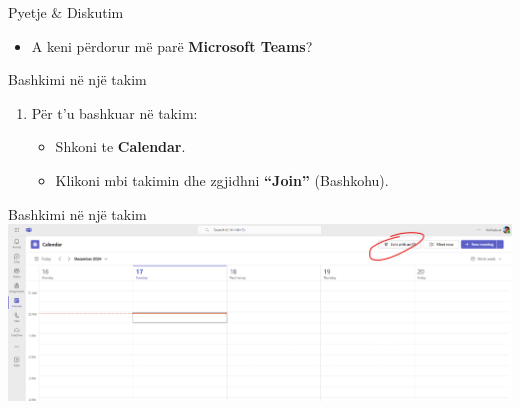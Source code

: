 \documentclass[
  ignorenonframetext,
]{beamer}
\providecommand{\tightlist}{%
  \setlength{\itemsep}{0pt}\setlength{\parskip}{0pt}}
\begin{document}
\begin{frame}{Pyetje \& Diskutim}
\label{pyetje-diskutim-8}
\begin{itemize}
\tightlist
\item
  A keni përdorur më parë \textbf{Microsoft Teams}?
\end{itemize}
\end{frame}

\begin{frame}{Bashkimi në një takim}
\label{bashkimi-nuxeb-njuxeb-takim}
\begin{enumerate}
\item
  Për t'u bashkuar në takim:

  \begin{itemize}
  \item
    Shkoni te \textbf{Calendar}.
  \item
    Klikoni mbi takimin dhe zgjidhni \textbf{``Join''} (Bashkohu).
  \end{itemize}
\end{enumerate}
\end{frame}

\begin{frame}{Bashkimi në një takim}
\label{bashkimi-nuxeb-njuxeb-takim-1}
\includegraphics{./images/teams6.png}
\end{frame}
\end{document}
